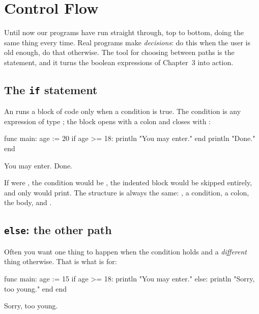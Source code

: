\chapter{Control Flow}%
\label{ch:control-flow} %

Until now our programs have run straight through, top to bottom, doing the same
thing every time. Real programs make \emph{decisions}: do this when the user is
old enough, do that otherwise. The tool for choosing between paths is the
 statement, and it turns the boolean expressions of Chapter~3 into
action.

\section{The \texttt{if} statement}

An  runs a block of code only when a condition is true. The condition is
any expression of type ; the block opens with a colon and closes with
:

\begin{salamen}
func main:
    age := 20
    if age >= 18:
        println "You may enter."
    end
    println "Done."
end
\end{salamen}

\begin{progout}
You may enter.
Done.
\end{progout}

If  were , the condition  would be
, the indented block would be skipped entirely, and only
 would print. The structure is always the same: , a
condition, a colon, the body, and .

\section{\texttt{else}: the other path}

Often you want one thing to happen when the condition holds and a \emph{different}
thing otherwise. That is what  is for:

\begin{salamen}
func main:
    age := 15
    if age >= 18:
        println "You may enter."
    else:
        println "Sorry, too young."
    end
end
\end{salamen}

\begin{progout}
Sorry, too young.
\end{progout}

